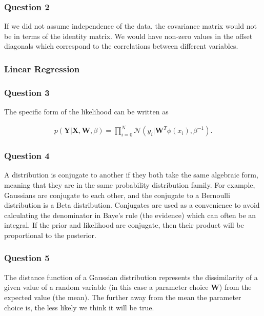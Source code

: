 \documentclass[10pt, a4paper, twocolumn]{article} %
\begin{document}

\subsubsection*{Question 2}
If we did not assume independence of the data, the covariance matrix would not be in terms of the identity matrix. We would have non-zero values in the offset diagonals which correspond to the correlations between different variables.

\subsubsection{Linear Regression}

\subsubsection*{Question 3}

The specific form of the likelihood can be written as

\begin{align}
  p(\mathbf{Y} | \mathbf{X}, \mathbf{W}, \beta) = \prod_{i=0}^N \mathcal{N} (y_i | \mathbf{W}^T\phi(x_i), \beta^{-1}) .
\end{align}

\subsubsection*{Question 4}

A distribution is conjugate to another if they both take the same algebraic form, meaning that they are in the same probability distribution family. For example, Gaussians are conjugate to each other, and the conjugate to a Bernoulli distribution is a Beta distribution. Conjugates are used as a convenience to avoid calculating the denominator in Baye's rule (the evidence) which can often be an integral. If the prior and likelihood are conjugate, then their product will be proportional to the posterior.


\subsubsection*{Question 5}

The distance function of a Gaussian distribution represents the dissimilarity of a given value of a random variable (in this case a parameter choice $\mathbf{W}$) from the expected value (the mean). The further away from the mean the parameter choice is, the less likely we think it will be true.
\end{document}
